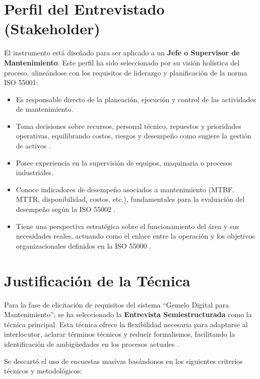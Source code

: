 \documentclass[12pt, a4paper]{article}
\begin{document}
\section{Perfil del Entrevistado (Stakeholder)}

El instrumento está diseñado para ser aplicado a un \textbf{Jefe o Supervisor de Mantenimiento}. Este perfil ha sido seleccionado por su visión holística del proceso, alineándose con los requisitos de liderazgo y planificación de la norma ISO 55001:

\begin{itemize}
    \item Es responsable directo de la planeación, ejecución y control de las actividades de mantenimiento.
    \item Toma decisiones sobre recursos, personal técnico, repuestos y prioridades operativas, equilibrando costos, riesgos y desempeño como sugiere la gestión de activos \parencite{iso:55001}.
    \item Posee experiencia en la supervisión de equipos, maquinaria o procesos industriales.
    \item Conoce indicadores de desempeño asociados a mantenimiento (MTBF, MTTR, disponibilidad, costos, etc.), fundamentales para la evaluación del desempeño según la ISO 55002 \parencite{iso:55002}.
    \item Tiene una perspectiva estratégica sobre el funcionamiento del área y sus necesidades reales, actuando como el enlace entre la operación y los objetivos organizacionales definidos en la ISO 55000 \parencite{iso:55000}.
\end{itemize}

\section{Justificación de la Técnica}

Para la fase de elicitación de requisitos del sistema ``Gemelo Digital para Mantenimiento'', se ha seleccionado la \textbf{Entrevista Semiestructurada} como la técnica principal. Esta técnica ofrece la flexibilidad necesaria para adaptarse al interlocutor, aclarar términos técnicos y reducir formalismos, facilitando la identificación de ambigüedades en los procesos actuales \parencite{sena:fundamentos2024}.

Se descartó el uso de encuestas masivas basándonos en los siguientes criterios técnicos y metodológicos:
\end{document}
